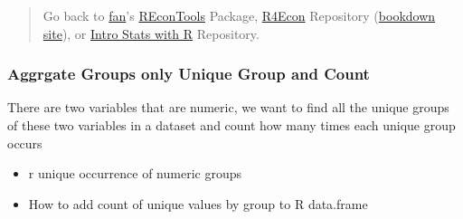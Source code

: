 \documentclass[
]{book}
\providecommand{\tightlist}{%
  \setlength{\itemsep}{0pt}\setlength{\parskip}{0pt}}
\begin{document}
\begin{quote}
Go back to \href{http://fanwangecon.github.io/}{fan}'s \href{https://fanwangecon.github.io/REconTools/}{REconTools} Package, \href{https://fanwangecon.github.io/R4Econ/}{R4Econ} Repository (\href{https://fanwangecon.github.io/R4Econ/bookdown}{bookdown site}), or \href{https://fanwangecon.github.io/Stat4Econ/}{Intro Stats with R} Repository.
\end{quote}

\hypertarget{aggrgate-groups-only-unique-group-and-count}{%
\subsubsection{Aggrgate Groups only Unique Group and Count}\label{aggrgate-groups-only-unique-group-and-count}}

There are two variables that are numeric, we want to find all the unique groups of these two variables in a dataset and count how many times each unique group occurs

\begin{itemize}
\tightlist
\item
  r unique occurrence of numeric groups
\item
  How to add count of unique values by group to R data.frame
\end{itemize}
\end{document}
